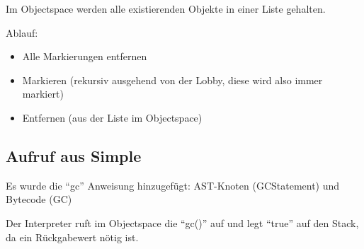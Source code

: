 \documentclass[12pt,a4paper,ngerman,parskip=full]{scrartcl}
\begin{document}
Im Objectspace werden alle existierenden Objekte in einer Liste gehalten.

Ablauf:
\begin{itemize}
\item Alle Markierungen entfernen
\item Markieren (rekursiv ausgehend von der Lobby, diese wird also immer markiert)
\item Entfernen (aus der Liste im Objectspace)
\end{itemize}

\subsection{Aufruf aus Simple}
\label{sec:org9a2afd8}
Es wurde die ``gc'' Anweisung hinzugefügt: AST-Knoten (GCStatement) und Bytecode (GC)

Der Interpreter ruft im Objectspace die ``gc()'' auf und legt ``true'' auf den Stack, da ein Rückgabewert nötig ist.
\end{document}
